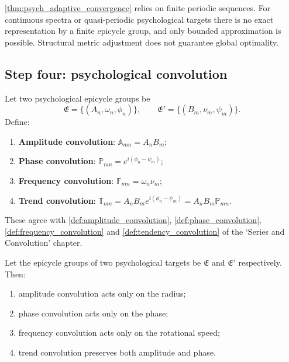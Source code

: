 \begin{remark}\label{rem:psych_adaptive_boundary}
\cref{thm:psych_adaptive_convergence} relies on finite periodic sequences. For continuous spectra or quasi-periodic psychological targets there is no exact representation by a finite epicycle group, and only bounded approximation is possible. Structural metric adjustment does not guarantee global optimality.
\end{remark}

\subsection{Step four: psychological convolution}

\begin{definition}\label{def:psych_convolution_types}
Let two psychological epicycle groups be
\[
\mathfrak E=\{(A_n,\omega_n,\phi_n)\},\qquad
\mathfrak E'=\{(B_m,\nu_m,\psi_m)\}.
\]
Define:
\begin{enumerate}[label=(\roman*)]
    \item \textbf{Amplitude convolution}: $\mathbb A_{mn}=A_nB_m$;
    \item \textbf{Phase convolution}: $\mathbb P_{mn}=e^{i(\phi_n-\psi_m)}$;
    \item \textbf{Frequency convolution}: $\mathbb F_{mn}=\omega_n\nu_m$;
    \item \textbf{Trend convolution}: $\mathbb T_{mn}=A_nB_m e^{i(\phi_n-\psi_m)}=A_nB_m\mathbb P_{mn}$.
\end{enumerate}
These agree with \cref{def:amplitude_convolution}, \cref{def:phase_convolution}, \cref{def:frequency_convolution} and \cref{def:tendency_convolution} of the `Series and Convolution' chapter.
\end{definition}

\begin{theorem}\label{thm:psych_convolution_action}
Let the epicycle groups of two psychological targets be $\mathfrak E$ and $\mathfrak E'$ respectively. Then:
\begin{enumerate}[label=(\roman*)]
    \item amplitude convolution acts only on the radius;
    \item phase convolution acts only on the phase;
    \item frequency convolution acts only on the rotational speed;
    \item trend convolution preserves both amplitude and phase.
\end{enumerate}
\end{theorem}

